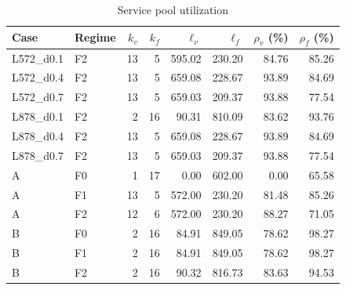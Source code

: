 \begin{table}[ht]
\centering\footnotesize
\caption{Service pool utilization}\label{tab:staff-utilization}
\begin{tabular}{@{}llrrrrrr@{}}\toprule
Case & Regime & $k_v$ & $k_f$ & $\ell_v$ & $\ell_f$ & $\rho_v$ (\%) & $\rho_f$ (\%)\\\midrule
L572\_d0.1 & F2 & 13 & 5 & 595.02 & 230.20 & 84.76 & 85.26\\
L572\_d0.4 & F2 & 13 & 5 & 659.08 & 228.67 & 93.89 & 84.69\\
L572\_d0.7 & F2 & 13 & 5 & 659.03 & 209.37 & 93.88 & 77.54\\
L878\_d0.1 & F2 & 2 & 16 & 90.31 & 810.09 & 83.62 & 93.76\\
L878\_d0.4 & F2 & 13 & 5 & 659.08 & 228.67 & 93.89 & 84.69\\
L878\_d0.7 & F2 & 13 & 5 & 659.03 & 209.37 & 93.88 & 77.54\\
A & F0 & 1 & 17 & 0.00 & 602.00 & 0.00 & 65.58\\
A & F1 & 13 & 5 & 572.00 & 230.20 & 81.48 & 85.26\\
A & F2 & 12 & 6 & 572.00 & 230.20 & 88.27 & 71.05\\
B & F0 & 2 & 16 & 84.91 & 849.05 & 78.62 & 98.27\\
B & F1 & 2 & 16 & 84.91 & 849.05 & 78.62 & 98.27\\
B & F2 & 2 & 16 & 90.32 & 816.73 & 83.63 & 94.53\\
\bottomrule\end{tabular}
\end{table}
